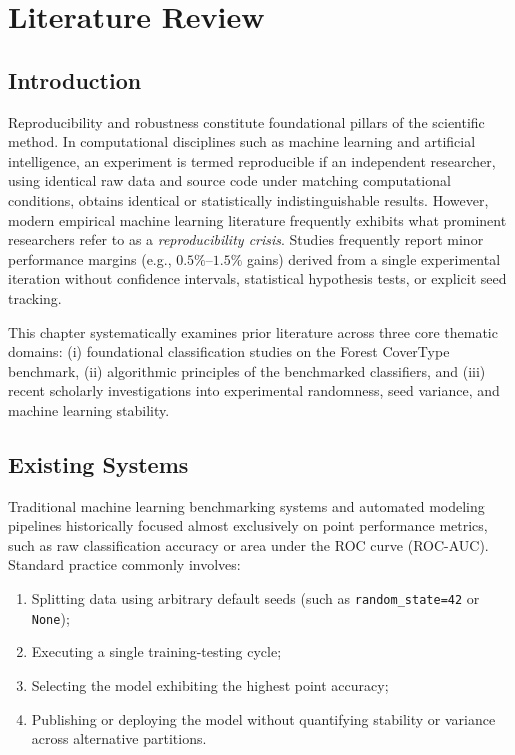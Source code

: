 \chapter{Literature Review}
\label{ch:literature_review}

\section{Introduction}
\label{sec:lit_intro}

Reproducibility and robustness constitute foundational pillars of the scientific method. In computational disciplines such as machine learning and artificial intelligence, an experiment is termed reproducible if an independent researcher, using identical raw data and source code under matching computational conditions, obtains identical or statistically indistinguishable results. However, modern empirical machine learning literature frequently exhibits what prominent researchers refer to as a \textit{reproducibility crisis}. Studies frequently report minor performance margins (e.g., $0.5\%$--$1.5\%$ gains) derived from a single experimental iteration without confidence intervals, statistical hypothesis tests, or explicit seed tracking.

This chapter systematically examines prior literature across three core thematic domains: (i) foundational classification studies on the Forest CoverType benchmark, (ii) algorithmic principles of the benchmarked classifiers, and (iii) recent scholarly investigations into experimental randomness, seed variance, and machine learning stability.

\section{Existing Systems}
\label{sec:existing_systems}

Traditional machine learning benchmarking systems and automated modeling pipelines historically focused almost exclusively on point performance metrics, such as raw classification accuracy or area under the ROC curve (ROC-AUC). Standard practice commonly involves:
\begin{enumerate}
    \item Splitting data using arbitrary default seeds (such as \texttt{random\_state=42} or \texttt{None});
    \item Executing a single training-testing cycle;
    \item Selecting the model exhibiting the highest point accuracy;
    \item Publishing or deploying the model without quantifying stability or variance across alternative partitions.
\end{enumerate}

